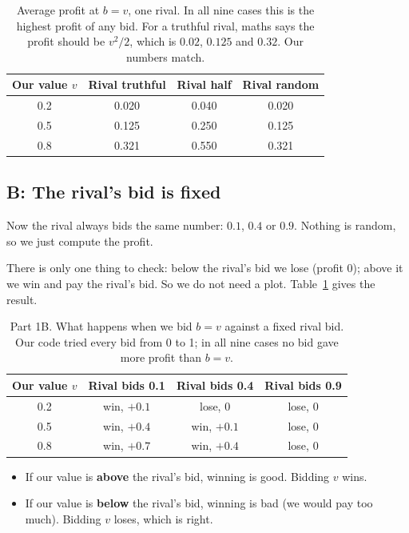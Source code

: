 \documentclass[11pt,a4paper]{article}
\begin{document}
\begin{table}[h]
\centering
\renewcommand{\arraystretch}{1.2}
\begin{tabular}{|c|c|c|c|}
\hline
\rowcolor{rowblue} \textbf{Our value $v$} & \textbf{Rival truthful} & \textbf{Rival half} & \textbf{Rival random} \\
\hline
0.2 & 0.020 & 0.040 & 0.020 \\ \hline
0.5 & 0.125 & 0.250 & 0.125 \\ \hline
0.8 & 0.321 & 0.550 & 0.321 \\
\hline
\end{tabular}
\caption{Average profit at $b = v$, one rival. In all nine cases this is the highest profit of any bid.
For a truthful rival, maths says the profit should be $v^2/2$, which is $0.02$, $0.125$ and $0.32$. Our numbers match.}
\end{table}

\subsection{B: The rival's bid is fixed}

Now the rival always bids the same number: $0.1$, $0.4$ or $0.9$. Nothing is random, so we just compute the profit.

There is only one thing to check: below the rival's bid we lose (profit $0$); above it we win and pay the rival's bid.
So we do not need a plot. Table~\ref{tab:1b} gives the result.

\begin{table}[h]
\centering
\renewcommand{\arraystretch}{1.2}
\begin{tabular}{|c|c|c|c|}
\hline
\rowcolor{rowblue} \textbf{Our value $v$} & \textbf{Rival bids 0.1} & \textbf{Rival bids 0.4} & \textbf{Rival bids 0.9} \\
\hline
0.2 & win, $+0.1$ & lose, $0$ & lose, $0$ \\ \hline
0.5 & win, $+0.4$ & win, $+0.1$ & lose, $0$ \\ \hline
0.8 & win, $+0.7$ & win, $+0.4$ & lose, $0$ \\
\hline
\end{tabular}
\caption{Part 1B. What happens when we bid $b = v$ against a fixed rival bid. Our code tried every bid from 0 to 1;
in all nine cases no bid gave more profit than $b = v$.}
\label{tab:1b}
\end{table}

\begin{itemize}
  \item If our value is \textbf{above} the rival's bid, winning is good. Bidding $v$ wins.
  \item If our value is \textbf{below} the rival's bid, winning is bad (we would pay too much). Bidding $v$ loses, which is right.
\end{itemize}
\end{document}

